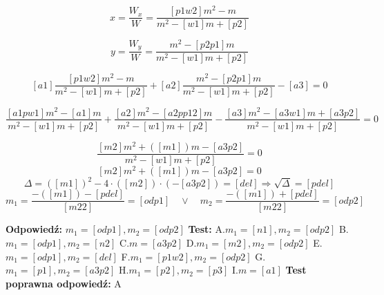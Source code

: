 \documentclass[12pt, a4paper]{article}
\theoremstyle{definition} %
\theoremstyle{definition} %
\newcommand{\rozwStop}{\newline}                                            %
\newcommand{\odpStart}{\noindent \textbf{Odpowiedź:}\newline}    %
\newcommand{\odpStop}{\newline}                                             %
\newcommand{\testStart}{\noindent \textbf{Test:}\newline} %
\newcommand{\testStop}{\newline} %
\newcommand{\kluczStart}{\noindent \textbf{Test poprawna odpowiedź:}\newline} %
\newcommand{\kluczStop}{\newline} %
\begin{document}
$$x=\frac{W_{x}}{W}=\frac{[p1w2]m^{2}-m}{m^{2}-[w1]m+[p2]}$$

$$y=\frac{W_{y}}{W}=\frac{m^{2}-[p2p1]m}{m^{2}-[w1]m+[p2]}$$

$$[a1]\frac{[p1w2]m^{2}-m}{m^{2}-[w1]m+[p2]}+[a2]\frac{m^{2}-[p2p1]m}{m^{2}-[w1]m+[p2]}-[a3]=0$$

$$\frac{[a1pw1]m^{2}-[a1]m}{m^{2}-[w1]m+[p2]}+\frac{[a2]m^{2}-[a2pp12]m}{m^{2}-[w1]m+[p2]}-\frac{[a3]m^{2}-[a3w1]m+[a3p2]}{m^{2}-[w1]m+[p2]}=0$$

$$\frac{[m2]m^{2}+([m1])m-[a3p2]}{m^{2}-[w1]m+[p2]}=0$$
$$[m2]m^{2}+([m1])m-[a3p2]=0$$
$$\Delta=([m1])^{2}-4\cdot([m2])\cdot(-[a3p2])=[del] \Rightarrow \sqrt{\Delta}=[pdel]$$
$$m_{1}=\frac{-([m1])-[pdel]}{[m22]}=[odp1]\quad \lor \quad m_{2}=\frac{-([m1])+[pdel]}{[m22]}=[odp2]$$



\rozwStop
\odpStart
$m_{1}=[odp1], m_{2}=[odp2]$
\odpStop
\testStart
A.$m_{1}=[n1], m_{2}=[odp2]$
B.$m_{1}=[odp1], m_{2}=[n2]$
C.$m=[a3p2]$
D.$m_{1}=[m2], m_{2}=[odp2]$
E.$m_{1}=[odp1], m_{2}=[del]$
F.$m_{1}=[p1w2], m_{2}=[odp2]$
G.$m_{1}=[p1], m_{2}=[a3p2]$
H.$m_{1}=[p2], m_{2}=[p3]$
I.$m=[a1]$
\testStop
\kluczStart
A
\kluczStop
\end{document}
